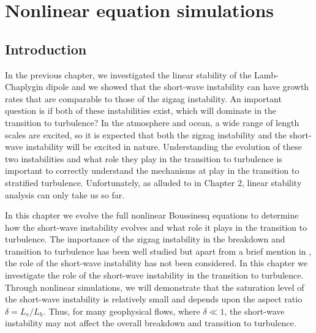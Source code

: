 \chapter{Nonlinear equation simulations}

\section{Introduction}
In the previous chapter, we investigated the linear stability of the Lamb-Chaplygin dipole and we showed that the short-wave instability can have growth rates that are comparable to those of the zigzag instability. An important question is if both of these instabilities exist, which will dominate in the transition to turbulence? In the atmosphere and ocean, a wide range of length scales are excited, so it is expected that both the zigzag instability and the short-wave instability will be excited in nature. Understanding the evolution of these two instabilities and what role they play in the transition to turbulence is important to correctly understand the mechanisms at play in the transition to stratified turbulence. Unfortunately, as alluded to in Chapter 2, linear stability analysis can only take us so far. 

In this chapter we evolve the full nonlinear Boussinesq equations to determine how the short-wave instability evolves and what role it plays in the transition to turbulence. The importance of the zigzag instability in the breakdown and transition to turbulence has been well studied \cite{augierbillant2011,augier2012,delonclebc2008,waitesmol2008} but apart from a brief mention in \cite{waitesmol2008}, the role of the short-wave instability has not been considered. In this chapter we investigate the role of the short-wave instability in the transition to turbulence. Through nonlinear simulations, we will demonstrate that the saturation level of the short-wave instability is relatively small and depends upon the aspect ratio $\delta=L_{v}/L_{h}$. Thus, for many geophysical flows, where $\delta\ll 1$, the short-wave instability may not affect the overall breakdown and transition to turbulence. 


